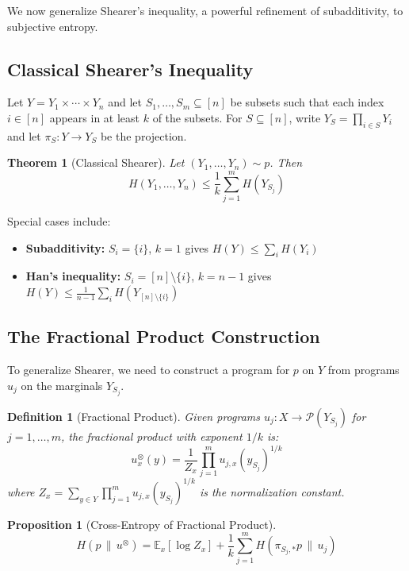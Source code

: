 \documentclass[11pt]{article}
\newtheorem{definition}{Definition}
\newtheorem{proposition}{Proposition}
\newtheorem{theorem}{Theorem}
\begin{document}
We now generalize Shearer's inequality, a powerful refinement of subadditivity, to subjective entropy.

\subsection*{Classical Shearer's Inequality}

Let $Y = Y_1 \times \cdots \times Y_n$ and let $S_1, \ldots, S_m \subseteq [n]$ be subsets such that each index $i \in [n]$ appears in at least $k$ of the subsets. For $S \subseteq [n]$, write $Y_S = \prod_{i \in S} Y_i$ and let $\pi_S: Y \to Y_S$ be the projection.

\begin{theorem}[Classical Shearer]
Let $(Y_1, \ldots, Y_n) \sim p$. Then
\[ H(Y_1, \ldots, Y_n) \leq \frac{1}{k} \sum_{j=1}^m H(Y_{S_j}) \]
\end{theorem}

Special cases include:
\begin{itemize}
    \item \textbf{Subadditivity:} $S_i = \{i\}$, $k = 1$ gives $H(Y) \leq \sum_i H(Y_i)$
    \item \textbf{Han's inequality:} $S_i = [n] \setminus \{i\}$, $k = n-1$ gives $H(Y) \leq \frac{1}{n-1}\sum_i H(Y_{[n]\setminus\{i\}})$
\end{itemize}

\subsection*{The Fractional Product Construction}

To generalize Shearer, we need to construct a program for $p$ on $Y$ from programs $u_j$ on the marginals $Y_{S_j}$.

\begin{definition}[Fractional Product]
Given programs $u_j: X \to \mathcal{P}(Y_{S_j})$ for $j = 1, \ldots, m$, the \emph{fractional product with exponent $1/k$} is:
\[ u^{\otimes}_{x}(y) = \frac{1}{Z_x} \prod_{j=1}^m u_{j,x}(y_{S_j})^{1/k} \]
where $Z_x = \sum_{y \in Y} \prod_{j=1}^m u_{j,x}(y_{S_j})^{1/k}$ is the normalization constant.
\end{definition}

\begin{proposition}[Cross-Entropy of Fractional Product]
\[ H(p \,\|\, u^{\otimes}) = \mathbb{E}_x[\log Z_x] + \frac{1}{k} \sum_{j=1}^m H(\pi_{S_j,*} p \,\|\, u_j) \]
\end{proposition}
\end{document}
